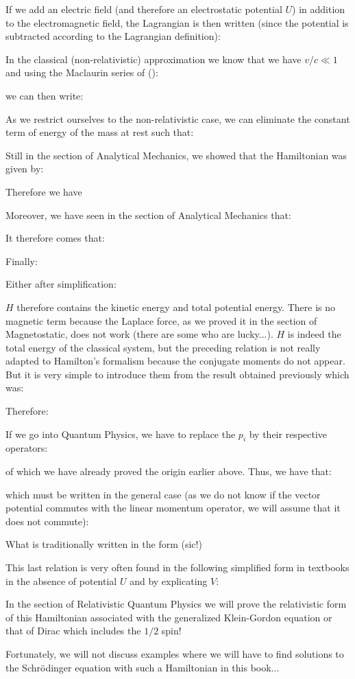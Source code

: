	If we add an electric field (and therefore an electrostatic potential $U$) in addition to the electromagnetic field, the Lagrangian is then written (since the potential is subtracted according to the Lagrangian definition):
	
	In the classical (non-relativistic) approximation we know that we have $v/c \ll 1$ and using the Maclaurin series of ():
	
	we can then write:
	
	As we restrict ourselves to the non-relativistic case, we can eliminate the constant term of energy of the mass at rest such that:
	
	Still in the section of Analytical Mechanics, we showed that the Hamiltonian was given by:
	
	Therefore we have
	
	Moreover, we have seen in the section of Analytical Mechanics that:
	
	It therefore comes that:
	
	Finally:
	
	Either after simplification:
	
	$H$ therefore contains the kinetic energy and total potential energy. There is no magnetic term because the Laplace force, as we proved it in the section of Magnetostatic, does not work (there are some who are lucky...). $H$ is indeed the total energy of the classical system, but the preceding relation is not really adapted to Hamilton's formalism because the conjugate moments do not appear. But it is very simple to introduce them from the result obtained previously which was:
	
	Therefore:
	
	If we go into Quantum Physics, we have to replace the $p_i$ by their respective operators:
	
	of which we have already proved the origin earlier above. Thus, we have that:
	
	which must be written in the general case (as we do not know if the vector potential commutes with the linear momentum operator, we will assume that it does not commute):
	
	What is traditionally written in the form (sic!)
	
	This last relation is very often found in the following simplified form in textbooks in the absence of potential $U$ and by explicating $V$:
	
	\begin{tcolorbox}[title=Remark,colframe=black,arc=10pt]
	In the section of Relativistic Quantum Physics we will prove the relativistic form of this Hamiltonian associated with the generalized Klein-Gordon equation or that of Dirac which includes the $1/2$ spin!
	\end{tcolorbox}
	Fortunately, we will not discuss examples where we will have to find solutions to the Schrödinger equation with such a Hamiltonian in this book...
	
